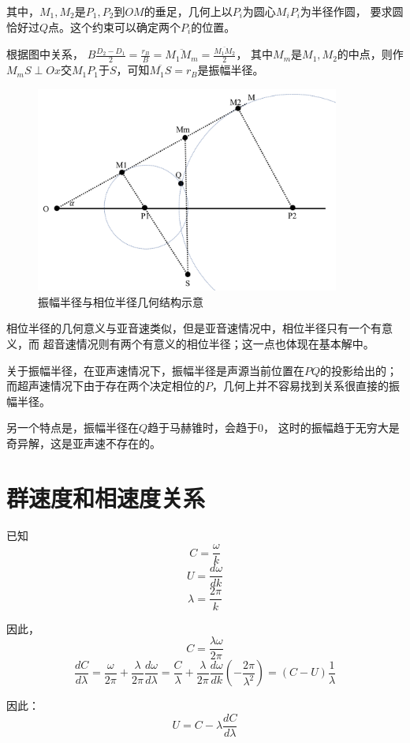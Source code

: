 \documentclass[UTF8,zihao=5]{ctexart} %
\begin{document}
其中，$M_1,M_2$是$P_1,P_2$到$OM$的垂足，几何上以$P_i$为圆心$M_iP_i$为半径作圆，
要求圆恰好过$Q$点。这个约束可以确定两个$P_i$的位置。

根据图中关系，
$B\frac{D_2-D_1}{2}=\frac{r_B}{B}=\overline{M_1M_m}=\frac{\overline{M_1M_2}}{2}$，
其中$M_m$是$M_1,M_2$的中点，则作$M_mS\perp Ox$交$M_1 P_1$于$S$，可知$\overline{M_1S}=r_B$是振幅半径。

\begin{figure}[H]
    \centering
    \includegraphics[width=10cm]{demo1.png}  %
    \caption{振幅半径与相位半径几何结构示意}
    \label{fig:demo1}
\end{figure}

相位半径的几何意义与亚音速类似，但是亚音速情况中，相位半径只有一个有意义，而
超音速情况则有两个有意义的相位半径；这一点也体现在基本解中。

关于振幅半径，在亚声速情况下，振幅半径是声源当前位置在$PQ$的投影给出的；
而超声速情况下由于存在两个决定相位的$P$，几何上并不容易找到关系很直接的振幅半径。

另一个特点是，振幅半径在$Q$趋于马赫锥时，会趋于0，
这时的振幅趋于无穷大是奇异解，这是亚声速不存在的。

\section{群速度和相速度关系}

已知
$$
    C=\frac{\omega}{k}
$$
$$
    U=\frac{d\omega}{dk}
$$
$$
    \lambda = \frac{2\pi}{k}
$$

因此，
$$
    C=\frac{\lambda\omega}{2\pi}
$$
$$
    \frac{dC}{d\lambda}=\frac{\omega}{2\pi} + \frac{\lambda}{2\pi}\frac{d\omega}{d\lambda}
    =\frac{C}{\lambda}+\frac{\lambda}{2\pi}\frac{d\omega}{dk}\left(
    -\frac{2\pi}{\lambda^2}
    \right)
    =\left(
    C - U
    \right)
    \frac{1}{\lambda}
$$

因此：
$$
    U=C-\lambda \frac{dC}{d\lambda}
$$
\end{document}
